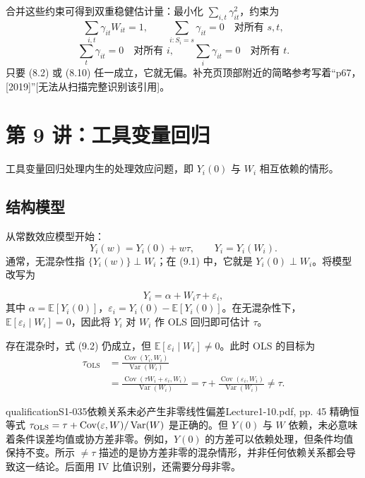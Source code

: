 合并这些约束可得到双重稳健估计量：最小化 $\sum_{i,t}\gamma_{it}^2$，约束为
\[
 \sum_{i,t}\gamma_{it}W_{it}=1,
 \qquad\sum_{i:S_i=s}\gamma_{it}=0\quad\text{对所有 }s,t,
\]
\[
 \sum_t\gamma_{it}=0\quad\text{对所有 }i,
 \qquad\sum_i\gamma_{it}=0\quad\text{对所有 }t.
\]
只要 (8.2) 或 (8.10) 任一成立，它就无偏。补充页顶部附近的简略参考写着“p67，[2019]”[无法从扫描完整识别该引用]。

\section{第 9 讲：工具变量回归}
工具变量回归处理内生的处理效应问题，即 $Y_i(0)$ 与 $W_i$ 相互依赖的情形。

\subsection{结构模型}
从常数效应模型开始：
\[
 Y_i(w)=Y_i(0)+w\tau,\qquad Y_i=Y_i(W_i).\tag{9.1}
\]
通常，无混杂性指 $\{Y_i(w)\}\perp W_i$；在 (9.1) 中，它就是 $Y_i(0)\perp W_i$。将模型改写为

\[
 Y_i=\alpha+W_i\tau+\varepsilon_i,\tag{9.2}
\]
其中 $\alpha=\mathbb E[Y_i(0)]$，$\varepsilon_i=Y_i(0)-\mathbb E[Y_i(0)]$。在无混杂性下，$\mathbb E[\varepsilon_i\mid W_i]=0$，因此将 $Y_i$ 对 $W_i$ 作 OLS 回归即可估计 $\tau$。

存在混杂时，式 (9.2) 仍成立，但 $\mathbb E[\varepsilon_i\mid W_i]\ne0$。此时 OLS 的目标为
\begin{align*}
 \tau_{\mathrm{OLS}}
 &=\frac{\operatorname{Cov}(Y_i,W_i)}{\operatorname{Var}(W_i)}\\
 &=\frac{\operatorname{Cov}(\tau W_i+\varepsilon_i,W_i)}{\operatorname{Var}(W_i)}
 =\tau+\frac{\operatorname{Cov}(\varepsilon_i,W_i)}{\operatorname{Var}(W_i)}
 \ne\tau.
\end{align*}
\begin{reviewnote}{qualification}{S1-035}{依赖关系未必产生非零线性偏差}{Lecture1-10.pdf, pp. 45}
精确恒等式 $\tau_{\rm OLS}=\tau+\operatorname{Cov}(\varepsilon,W)/\operatorname{Var}(W)$ 是正确的。但 $Y(0)$ 与 $W$ 依赖，未必意味着条件误差均值或协方差非零。例如，$Y(0)$ 的方差可以依赖处理，但条件均值保持不变。所示 $\ne\tau$ 描述的是协方差非零的混杂情形，并非任何依赖关系都会导致这一结论。后面用 IV 比值识别，还需要分母非零。
\end{reviewnote}


